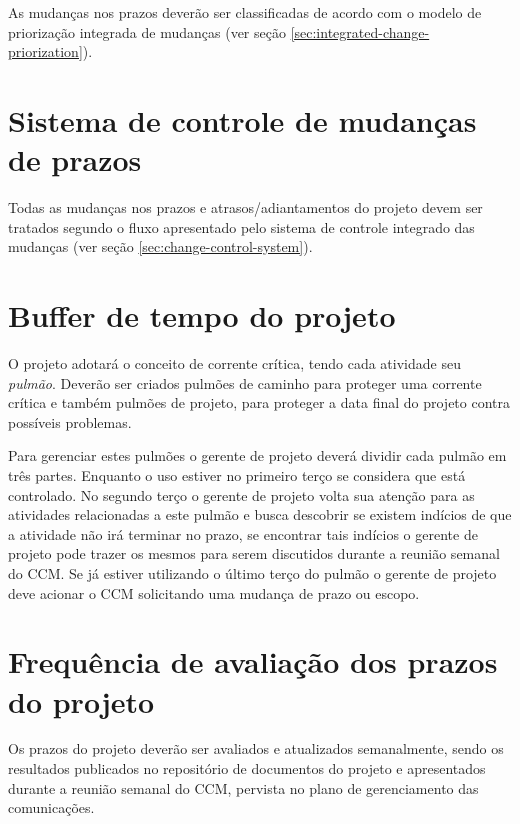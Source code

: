 As mudanças nos prazos deverão ser classificadas de acordo com o modelo de priorização integrada de mudanças (ver seção \ref{sec:integrated-change-priorization}).

\section{Sistema de controle de mudanças de prazos}

Todas as mudanças nos prazos e atrasos/adiantamentos do projeto devem ser tratados segundo o fluxo apresentado pelo sistema de controle integrado das mudanças (ver seção \ref{sec:change-control-system}).


\section{Buffer de tempo do projeto}

O projeto adotará o conceito de corrente crítica, tendo cada atividade seu \emph{pulmão}. Deverão ser criados pulmões de caminho para proteger uma corrente crítica e também pulmões de projeto, para proteger a data final do projeto contra possíveis problemas.

Para gerenciar estes pulmões o gerente de projeto deverá dividir cada pulmão em três partes. Enquanto o uso estiver no primeiro terço se considera que está controlado. No segundo terço o gerente de projeto volta sua atenção para as atividades relacionadas a este pulmão e busca descobrir se existem indícios de que a atividade não irá terminar no prazo, se encontrar tais indícios o gerente de projeto pode trazer os mesmos para serem discutidos durante a reunião semanal do CCM. Se já estiver utilizando o último terço do pulmão o gerente de projeto deve acionar o CCM solicitando uma mudança de prazo ou escopo.

\section{Frequência de avaliação dos prazos do projeto}

Os prazos do projeto deverão ser avaliados e atualizados semanalmente, sendo os resultados publicados no repositório de documentos do projeto e apresentados durante a reunião semanal do CCM, pervista no plano de gerenciamento das comunicações.

